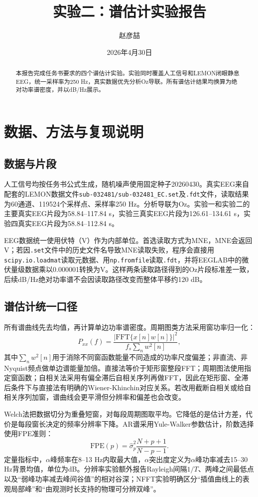 \documentclass[UTF8,zihao=-4,fontset=windows]{ctexart}
\title{\heiti 实验二：谱估计实验报告}
\author{赵彦喆}
\date{2026年4月30日}
\begin{document}
\maketitle

\begin{abstract}
本报告完成任务书要求的四个谱估计实验。实验同时覆盖人工信号和LEMON闭眼静息EEG，统一采样率为250 Hz，真实数据优先分析Oz导联。所有谱估计结果均换算为绝对功率谱密度，并以dB/Hz展示。
\end{abstract}

\section{数据、方法与复现说明}

\subsection{数据与片段}
人工信号均按任务书公式生成，随机噪声使用固定种子20260430。真实EEG来自配套的LEMON数据文件\texttt{sub-032481/sub-032481\_EC.set}及\texttt{.fdt}文件，读取结果为60通道、119524个采样点、采样率250 Hz。分析导联为Oz。实验一和实验二的主要真实EEG片段为58.84--117.84 s，实验三真实EEG片段为126.61--134.61 s，实验四真实EEG片段为58.84--112.84 s。

EEG数据统一使用伏特（V）作为内部单位。首选读取方式为MNE，MNE会返回V；若因\texttt{.set}文件中的历史文件名导致MNE读取失败，程序会直接用\texttt{scipy.io.loadmat}读取元数据、用\texttt{np.fromfile}读取\texttt{.fdt}，并将EEGLAB中的微伏量级数据乘以0.000001转换为V。这样两条读取路径得到的Oz片段标准差一致，后续dB/Hz绝对功率谱不会因读取路径改变而整体平移约120 dB。

\subsection{谱估计统一口径}
所有谱曲线先去均值，再计算单边功率谱密度。周期图类方法采用窗功率归一化：
\[
P_{xx}(f)=\frac{|\mathrm{FFT}\{x[n]w[n]\}|^2}{f_s\sum_n w^2[n]},
\]
其中$\sum_n w^2[n]$用于消除不同窗函数能量不同造成的功率尺度偏差；非直流、非Nyquist频点做单边谱能量加倍。直接法等价于矩形窗整段FFT；周期图法使用指定窗函数；自相关法采用有偏全滞后自相关序列再做FFT，因此在矩形窗、全滞后条件下与直接法有明确的Wiener-Khinchin对应关系。若改用截断自相关或给自相关序列加窗，谱曲线会更平滑但分辨率和偏差也会改变。

Welch法把数据切分为重叠短窗，对每段周期图取平均。它降低的是估计方差，代价是每段窗长决定的频率分辨率下降。AR谱采用Yule-Walker参数估计，阶数选择使用FPE准则：
\[
\mathrm{FPE}(p)=\hat{\sigma}_p^2\frac{N+p+1}{N-p-1}.
\]
定量指标中，$\alpha$峰频率在8--13 Hz内取最大值，$\alpha$突出度定义为$\alpha$峰功率减去15--30 Hz背景均值，单位为dB。分辨率实验额外报告Rayleigh间隔$1/T$、两峰之间最低点以及“弱峰功率减去峰间谷值”的相对谷深；NFFT实验明确区分“插值曲线上的表观局部峰”和“由观测时长支持的物理可分辨双峰”。
\end{document}
